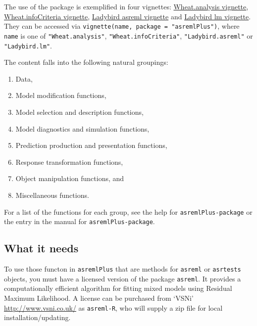 \documentclass[
]{article}
\begin{document}
The use of the package is exemplified in four vignettes:
\href{./vignettes/Wheat.analysis.pdf}{Wheat.analysis vignette},
\href{./vignettes/Wheat.infoCriteria.pdf}{Wheat.infoCriteria vignette},
\href{./vignettes/Ladybird.asreml.pdf}{Ladybird asreml vignette} and
\href{./vignettes/Ladybird.asreml.pdf}{Ladybird lm vignette}. They can
be accessed via \texttt{vignette(name,\ package\ =\ "asremlPlus")},
where \texttt{name} is one of \texttt{"Wheat.analysis"},
\texttt{"Wheat.infoCriteria"}, \texttt{"Ladybird.asreml"} or
\texttt{"Ladybird.lm"}.

The content falls into the following natural groupings:

\begin{enumerate}
\def\labelenumi{(\roman{enumi})}
\item
  Data,
\item
  Model modification functions,
\item
  Model selection and description functions,
\item
  Model diagnostics and simulation functions,
\item
  Prediction production and presentation functions,
\item
  Response transformation functions,
\item
  Object manipulation functions, and
\item
  Miscellaneous functions.
\end{enumerate}

For a list of the functions for each group, see the help for
\texttt{asremlPlus-package} or the entry in the manual for
\texttt{asremlPlus-package}.

\subsection{What it needs}\label{what-it-needs}

To use those functon in \texttt{asremlPlus} that are methods for
\texttt{asreml} or \texttt{asrtests} objects, you must have a licensed
version of the package \texttt{asreml}. It provides a computationally
efficient algorithm for fitting mixed models using Residual Maximum
Likelihood. A license can be purchased from `VSNi'
\url{http://www.vsni.co.uk/} as \texttt{asreml-R}, who will supply a zip
file for local installation/updating.
\end{document}
